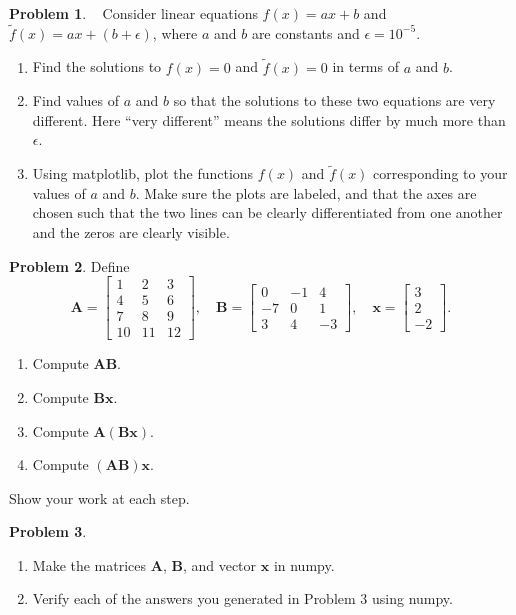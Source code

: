 \documentclass[12pt]{article}
\theoremstyle{definition}
\newtheorem{problem}{Problem}
\renewcommand{\vec}{\mathbf}
\begin{document}
\clearpage

\begin{problem}~
    Consider linear equations $f(x) = a x + b$ and $\tilde{f}(x) = a x + (b+\epsilon)$, where $a$ and $b$ are constants and $\epsilon = 10^{-5}$.
    \begin{enumerate}
        \item Find the solutions to $f(x) = 0$ and $\tilde{f}(x) = 0$ in terms of $a$ and $b$.
        \item Find values of $a$ and $b$ so that the solutions to these two equations are very different. Here ``very different'' means the solutions differ by much more than $\epsilon$.
        \item Using matplotlib, plot the functions $f(x)$ and $\tilde{f}(x)$ corresponding to your values of $a$ and $b$.
            Make sure the plots are labeled, and that the axes are chosen such that the two lines can be clearly differentiated from one another and the zeros are clearly visible.
    \end{enumerate}
\end{problem}


\begin{problem}
Define 
\begin{equation*}
    \vec{A} = \begin{bmatrix} 1 & 2 & 3 \\ 4 & 5 & 6 \\ 7 & 8 & 9 \\ 10 & 11 & 12\end{bmatrix}
    ,\quad
    \vec{B} = \begin{bmatrix} 0 & -1 & 4 \\ -7 & 0 & 1 \\ 3 & 4 & -3\end{bmatrix}
    ,\quad
    \vec{x} = \begin{bmatrix} 3 \\ 2 \\ -2\end{bmatrix}.
\end{equation*}

    \begin{enumerate}
        \item Compute $\vec{A} \vec{B}$.
        \item Compute $\vec{B} \vec{x}$.
        \item Compute $\vec{A} (\vec{B} \vec{x})$.
        \item Compute $(\vec{A}\vec{B}) \vec{x}$.
    \end{enumerate}
Show your work at each step.
\end{problem}

\begin{problem}~
\begin{enumerate}
    \item Make the matrices $\vec{A}$, $\vec{B}$, and vector $\vec{x}$ in numpy.
    \item Verify each of the answers you generated in Problem 3 using numpy. 
\end{enumerate}
\end{problem}
\end{document}
